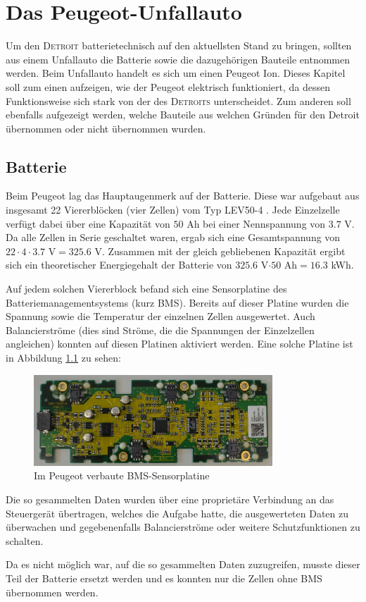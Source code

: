 \chapter{Das Peugeot-Unfallauto}
Um den \textsc{Detroit} batterietechnisch auf den aktuellsten Stand zu bringen, sollten aus einem Unfallauto die Batterie sowie die dazugehörigen Bauteile entnommen werden. Beim Unfallauto handelt es sich um einen Peugeot Ion. Dieses Kapitel soll zum einen aufzeigen, wie der Peugeot elektrisch funktioniert, da dessen Funktionsweise sich stark von der des \textsc{Detroits} unterscheidet. Zum anderen soll ebenfalls aufgezeigt werden, welche Bauteile aus welchen Gründen für den {Detroit} übernommen oder nicht übernommen wurden.

\section{Batterie}
Beim Peugeot lag das Hauptaugenmerk auf der Batterie. Diese war aufgebaut aus insgesamt 22 Viererblöcken (vier Zellen) vom Typ LEV50-4 \cite{lev50}. Jede Einzelzelle verfügt dabei über eine Kapazität von $50$ Ah bei einer Nennspannung von $3.7$ V. Da alle Zellen in Serie geschaltet waren, ergab sich eine Gesamtspannung von $22\cdot 4\cdot 3.7$ V$=325.6$ V. Zusammen mit der gleich gebliebenen Kapazität ergibt sich ein theoretischer Energiegehalt der Batterie von $325.6$ V$\cdot50$ Ah$=16.3$ kWh.

Auf jedem solchen Viererblock befand sich eine Sensorplatine des Batteriemanagementsystems (kurz BMS). Bereits auf dieser Platine wurden die Spannung sowie die Temperatur der einzelnen Zellen ausgewertet. Auch Balancierströme (dies sind Ströme, die die Spannungen der Einzelzellen angleichen) konnten auf diesen Platinen aktiviert werden. Eine solche Platine ist in Abbildung \ref{fig:BMS_Alt} zu sehen:

\begin{figure}[h!]
	\centering
		\includegraphics[width=0.80\textwidth]{images/BMS_Alt.JPG}
	\caption{Im Peugeot verbaute BMS-Sensorplatine}
	\label{fig:BMS_Alt}
\end{figure}

Die so gesammelten Daten wurden über eine proprietäre Verbindung an das Steuergerät übertragen, welches die Aufgabe hatte, die ausgewerteten Daten zu überwachen und gegebenenfalls Balancierströme oder weitere Schutzfunktionen zu schalten.

Da es nicht möglich war, auf die so gesammelten Daten zuzugreifen, musste dieser Teil der Batterie ersetzt werden und es konnten nur die Zellen ohne BMS übernommen werden.


\newpage